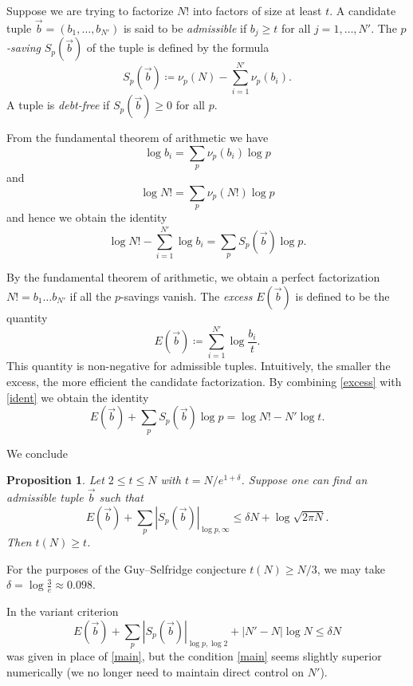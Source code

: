 \documentclass[12pt,a4paper,reqno]{amsart}
\numberwithin{equation}{section}
\theoremstyle{plain}
\newtheorem{proposition}[theorem]{Proposition}
\theoremstyle{definition}
\begin{document}
Suppose we are trying to factorize $N!$ into factors of size at least $t$.  A candidate tuple $\vec b = (b_1,\dots,b_{N'})$ is said to be \emph{admissible} if $b_j \geq t$ for all $j=1,\dots,N'$.  The \emph{$p$-saving} $S_p(\vec b)$ of the tuple is defined by the formula
$$ S_p(\vec b) \coloneqq \nu_p(N) - \sum_{i=1}^{N'} \nu_p(b_i).$$
A tuple is \emph{debt-free} if $S_p(\vec b) \geq 0$ for all $p$.

From the fundamental theorem of arithmetic we have
$$ \log b_i = \sum_p \nu_p(b_i) \log p$$
and 
$$ \log N! = \sum_p \nu_p(N!) \log p$$
and hence we obtain the identity 
\begin{equation}\label{ident}
   \log N! - \sum_{i=1}^{N'} \log b_i = \sum_p S_p(\vec b) \log p.
\end{equation}

By the fundamental theorem of arithmetic, we obtain a perfect factorization $N! = b_1 \dots b_{N'}$ if all the $p$-savings vanish.  The \emph{excess} $E(\vec b)$ is defined to be the quantity
\begin{equation}\label{excess} 
  E(\vec b) \coloneqq \sum_{i=1}^{N'} \log \frac{b_i}{t}.
\end{equation}
This quantity is non-negative for admissible tuples.  Intuitively, the smaller the excess, the more efficient the candidate factorization.  By combining \eqref{excess} with \eqref{ident} we obtain the identity
\begin{equation}\label{excess-save}
  E(\vec b) + \sum_p S_p(\vec b) \log p = \log N! - N' \log t.
\end{equation}

We conclude

\begin{proposition}  Let $2 \leq t \leq N$ with $t = N /e^{1+\delta}$.  Suppose one can find an admissible tuple $\vec b$ such that
\begin{equation}\label{main} 
  E(\vec b) + \sum_p |S_p(\vec b)|_{\log p,\infty}  \leq \delta N + \log \sqrt{2\pi N}.
\end{equation}
Then $t(N) \geq t$.
\end{proposition}

For the purposes of the Guy--Selfridge conjecture $t(N) \geq N/3$, we may take $\delta = \log \frac{3}{e} \approx 0.098$.  

In \cite[Proposition 3.1]{tao} the variant criterion
$$ 
E(\vec b)  + \sum_p |S_p(\vec b)|_{\log p,\log 2} + |N'-N| \log N \leq \delta N$$
was given in place of \eqref{main}, but the condition \eqref{main} seems slightly superior numerically (we no longer need to maintain direct control on $N'$).
\end{document}
